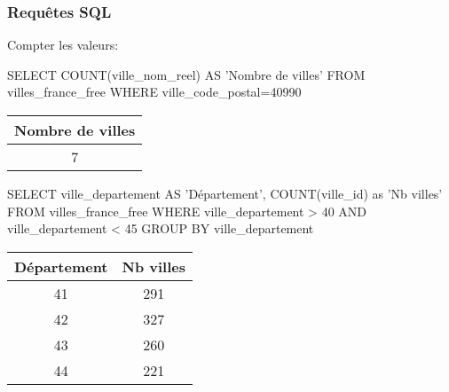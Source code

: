 \begin{frame}[fragile]
\frametitle{Requêtes SQL}

Compter les valeurs:

\begin{GrayBox}[0.85\textwidth]
\begin{semiverbatim}\small
SELECT COUNT(ville_nom_reel) AS 'Nombre de villes'
FROM villes_france_free
WHERE ville_code_postal=40990
\end{semiverbatim}
\end{GrayBox}

\begin{center}
\begin{tabular}{|c|}
\hline
\textbf{Nombre de villes} \\
\hline
7 \\
\hline
\end{tabular}
\end{center}

\begin{minipage}{0.65\linewidth}
\begin{GrayBox}[0.9\textwidth]
\begin{semiverbatim}\small
SELECT ville_departement AS 'Département',
COUNT(ville_id) as 'Nb villes'
FROM villes_france_free
WHERE ville_departement > 40
    AND ville_departement < 45
GROUP BY ville_departement
\end{semiverbatim}
\end{GrayBox}
\end{minipage}\hfill
\begin{minipage}{0.3\linewidth}

\begin{center}
\begin{tabular}{|c|c|}
\hline
\textbf{Département} & \textbf{Nb villes} \\
\hline
41 & 291 \\
\hline
42 & 327 \\
\hline
43 & 260 \\
\hline
44 & 221 \\
\hline
\end{tabular}
\end{center}
\end{minipage}

\end{frame}

